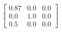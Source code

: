 \documentclass[preview]{standalone}
\begin{document}
\begin{align*}
\left[ \begin{array}{ccc}0.87 & 0.0 & 0.0 \\ 0.0 & 1.0 & 0.0 \\ 0.5 & 0.0 & 0.0\end{array} \right]
\end{align*}
\end{document}
